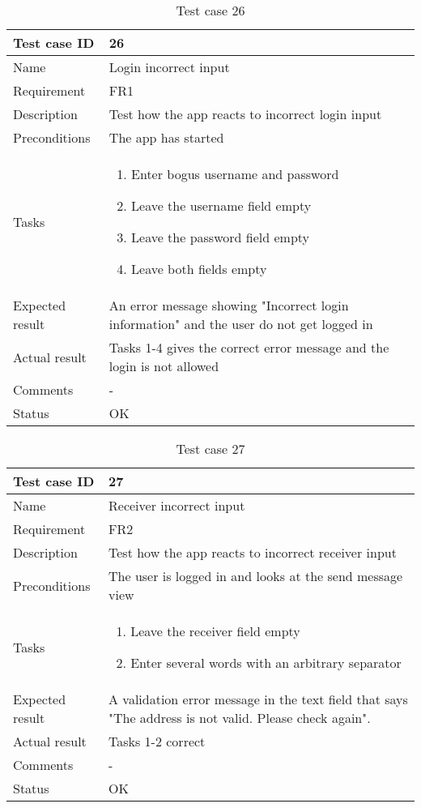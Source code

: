 			\begin{table}
			\begin{tabular}{l|p{10cm}}
				Test case ID & 26\\ \hline
				Name & Login incorrect input\\ \hline
				Requirement & FR1\\ \hline
				Description&Test how the app reacts to incorrect login input\\ \hline
				Preconditions&The app has started\\ \hline
				Tasks&\begin{enumerate}
						\item{}Enter bogus username and password
						\item{}Leave the username field empty
						\item{}Leave the password field empty
						\item{}Leave both fields empty
					\end{enumerate} \\ \hline
				Expected result&An error message showing "Incorrect login information" and the user do not get logged in\\ \hline
				Actual result& Tasks 1-4 gives the correct error message and the login is not allowed\\ \hline
				Comments&- \\ \hline
				Status& OK\\ \hline 
			\end{tabular}
			\caption{Test case 26} \label{tab:case26}
			\end{table}

				\begin{table}
			\begin{tabular}{l|p{10cm}}
				Test case ID & 27\\ \hline
				Name & Receiver incorrect input\\ \hline
				Requirement & FR2\\ \hline
				Description&Test how the app reacts to incorrect receiver input\\ \hline
				Preconditions&The user is logged in and looks at the send message view\\ \hline
				Tasks&\begin{enumerate}
						\item{}Leave the receiver field empty
						\item{}Enter several words with an arbitrary separator
					\end{enumerate} \\ \hline
				Expected result&A validation error message in the text field that says "The address is not valid. Please check again". \\ \hline
				Actual result&Tasks 1-2 correct\\ \hline
				Comments&-\\ \hline
				Status& OK\\ \hline 
			\end{tabular}
			\caption{Test case 27} \label{tab:case27}
			\end{table}

